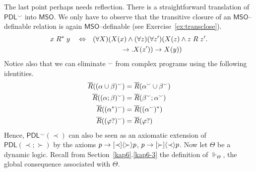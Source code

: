 The last point perhaps needs reflection. There is a straightforward
translation of $\mathsf{PDL}^{\smallsmile}$ into $\mathsf{MSO}$. We only
have to observe that the transitive closure of an $\mathsf{MSO}$--definable
relation is again $\mathsf{MSO}$--definable (see 
Exercise~\ref{ex:transclose}).
\begin{align}
x\; R^{\ast}\; y\quad \Leftrightarrow\quad & 
(\forall X)(X(x) \wedge (\forall z)(\forall z')(X(z) \wedge
    z\; R\; z'. \\\notag
	& \qquad\qquad \rightarrow .X(z')) \rightarrow X(y))
\end{align}
Notice also that we can eliminate $^{\smallsmile}$ from complex
programs using the following identities.
\begin{subequations}
\begin{align}
\overline{R}((\alpha\cup\beta)^{\smallsmile}) & = 
        \overline{R}(\alpha^{\smallsmile} \cup \beta^{\smallsmile}) \\
\overline{R}((\alpha;\beta)^{\smallsmile}) & = 
        \overline{R}(\beta^{\smallsmile};\alpha^{\smallsmile}) \\
\overline{R}((\alpha^{\ast})^{\smallsmile}) & = 
        \overline{R}((\alpha^{\smallsmile})^{\ast}) \\
\overline{R}((\varphi?)^{\smallsmile}) & = \overline{R}(\varphi?)
\end{align}
\end{subequations}
Hence, $\mathsf{PDL}^{\smallsmile}(\prec)$ can also be seen as
an axiomatic extension of $\mathsf{PDL}(\prec;\succ)$ by the
axioms $p \rightarrow [\prec]\langle \succ\rangle p$, $p \rightarrow [\succ]\langle \prec\rangle p$.
Now let $\Theta$ be a dynamic logic.  Recall from 
Section~\ref{kap6}.\ref{kap6-3} the definition of $\Vdash_{\Theta}$, 
the global consequence associated with $\Theta$.

